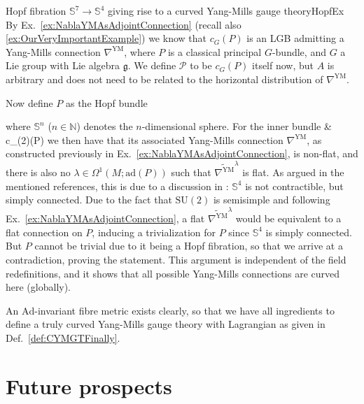 \documentclass[a4paper,oneside,11pt,bibliography=totoc]{scrartcl}
\def\bas#1\eas{\begin{align*}#1\end{align*}}
\theoremstyle{plain}
\theoremstyle{remark}
\theoremstyle{definition}
\begin{document}
\begin{examples}{Hopf fibration $\mathds{S}^7 \to \mathds{S}^4$ giving rise to a curved Yang-Mills gauge theory}{HopfEx}
By Ex.\ \ref{ex:NablaYMAsAdjointConnection} (recall also \ref{ex:OurVeryImportantExample}) we know that $c_G(P)$ is an LGB admitting a Yang-Mills connection $\nabla^{\mathrm{YM}}$, where $P$ is a classical principal $G$-bundle, and $G$ a Lie group with Lie algebra $\mathfrak{g}$. We define $\mathcal{P}$ to be $c_G(P)$ itself now, but $A$ is arbitrary and does not need to be related to the horizontal distribution of $\nabla^{\mathrm{YM}}$.

Now define $P$ as the Hopf bundle
\begin{center}
\end{center}
where $\mathds{S}^n$ ($n \in \mathbb{N}$) denotes the $n$-dimensional sphere.
For the inner bundle
\bas
\mathcal{P}
\coloneqq
{}
&\coloneqq
c_{(2)}(P)
\eas
we then have that its associated Yang-Mills connection $\nabla^{\mathrm{YM}}$, as constructed previously in Ex.\ \ref{ex:NablaYMAsAdjointConnection}, is non-flat, and there is also no $\lambda \in \Omega^1(M; \mathrm{ad}(P))$ such that $\widetilde{\nabla^{\mathrm{YM}}}^\lambda$ is flat. As argued in the mentioned references, this is due to a discussion in \cite[Example 7.3.20; page 287]{mackenzieGeneralTheory}: $\mathds{S}^4$ is not contractible, but simply connected. Due to the fact that $\mathrm{SU}(2)$ is semisimple and following Ex.\ \ref{ex:NablaYMAsAdjointConnection}, a flat $\widetilde{\nabla^{\mathrm{YM}}}^\lambda$ would be equivalent to a flat connection on $P$, inducing a trivialization for $P$ since $\mathds{S}^4$ is simply connected. But $P$ cannot be trivial due to it being a Hopf fibration, so that we arrive at a contradiction, proving the statement. This argument is independent of the field redefinitions, and it shows that all possible Yang-Mills connections are curved here (globally).

An $\mathrm{Ad}$-invariant fibre metric exists clearly, so that we have all ingredients to define a truly curved Yang-Mills gauge theory with Lagrangian as given in Def.\ \ref{def:CYMGTFinally}.
\end{examples}

\section{Future prospects}\label{conclusions}
\end{document}
